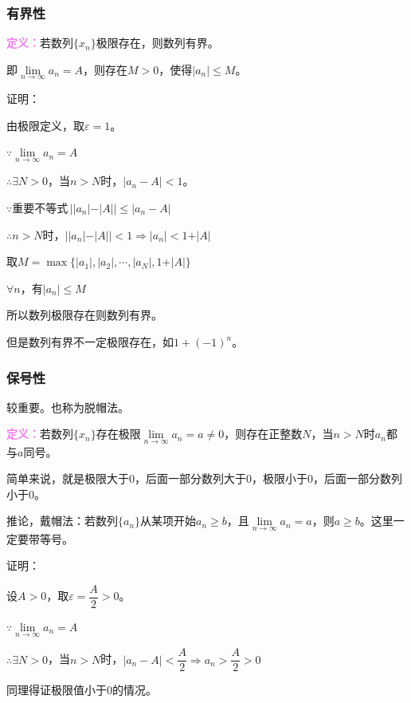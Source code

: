 \documentclass[UTF8, 12pt]{ctexart}
\begin{document}
    \subsubsection{有界性}

    \textcolor{violet}{\textbf{定义：}}若数列$\{x_n\}$极限存在，则数列有界。

    即$\lim\limits_{n\to\infty}a_n=A$，则存在$M>0$，使得$\vert a_n\vert\leqslant M$。

    证明：

    由极限定义，取$\varepsilon=1$。

    $\because\lim\limits_{n\to\infty}a_n=A$

    $\therefore\exists N>0$，当$n>N$时，$\vert a_n-A\vert<1$。

    $\because\text{重要不等式}\,\vert\vert a_n\vert-\vert A\vert\vert\leqslant\vert a_n-A\vert$

    $\therefore n>N$时，$\vert\vert a_n\vert-\vert A\vert\vert<1\Rightarrow\vert a_n\vert<1+\vert A\vert$

    取$M=\max\{\vert a_1\vert,\vert a_2\vert,\cdots,\vert a_N\vert,1+\vert A\vert\}$

    $\forall n$，有$\vert a_n\vert\leqslant M$

    所以数列极限存在则数列有界。

    但是数列有界不一定极限存在，如$1+(-1)^n$。

    \subsubsection{保号性}

    较重要。也称为脱帽法。

    \textcolor{violet}{\textbf{定义：}}若数列$\{x_n\}$存在极限$\lim\limits_{n\to\infty}a_n=a\neq 0$，则存在正整数$N$，当$n>N$时$a_n$都与$a$同号。

    简单来说，就是极限大于0，后面一部分数列大于0，极限小于0，后面一部分数列小于0。

    推论，戴帽法：若数列$\{a_n\}$从某项开始$a_n\geqslant b$，且$\lim\limits_{n\to\infty}a_n=a$，则$a\geqslant b$。这里一定要带等号。

    证明：

    设$A>0$，取$\varepsilon=\dfrac{A}{2}>0$。

    $\because\lim\limits_{n\to\infty}a_n=A$

    $\therefore\exists N>0$，当$n>N$时，$\vert a_n-A\vert<\dfrac{A}{2}\Rightarrow a_n>\dfrac{A}{2}>0$

    同理得证极限值小于0的情况。
\end{document}
